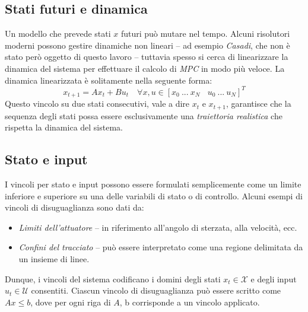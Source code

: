 \subsection{Stati futuri e dinamica}
Un modello che prevede stati $x$ futuri può mutare nel tempo. Alcuni risolutori moderni
possono gestire dinamiche non lineari -- ad esempio \textit{Casadi}, che non è stato però oggetto 
di questo lavoro -- tuttavia spesso si cerca di linearizzare la dinamica del sistema per 
effettuare il calcolo di \textit{MPC} in modo più veloce. La dinamica linearizzata è solitamente nella seguente forma:
\[
x_{t+1} = Ax_t+Bu_t \quad \forall x,u \in [x_0 \ ... \ x_N \ \ \ \ u_0 \ ... \ u_N]^T
\]
Questo vincolo su due stati consecutivi, vale a dire $x_t$ e $x_{t+1}$, garantisce che la sequenza 
degli stati possa essere esclusivamente una \textit{traiettoria realistica} che rispetta la 
dinamica del sistema.

\subsection{Stato e input}
I vincoli per stato e input possono essere formulati semplicemente come un limite inferiore e 
superiore su una delle variabili di stato o di controllo.
Alcuni esempi di vincoli di disuguaglianza sono dati da:
\begin{itemize}
    \item \textit{Limiti dell'attuatore} -- in riferimento all'angolo di sterzata, alla velocità, ecc.
    \item \textit{Confini del tracciato} -- può essere interpretato come una regione delimitata da un insieme di linee.
\end{itemize}
Dunque, i vincoli del sistema codificano i domini degli stati
$x_t \in \mathcal{X}$ e degli input $u_t \in \mathcal{U}$ 
consentiti.
Ciascun vincolo di disuguaglianza può essere scritto come $Ax \le b$, dove per ogni riga di $A$, b corrisponde a un vincolo applicato.

